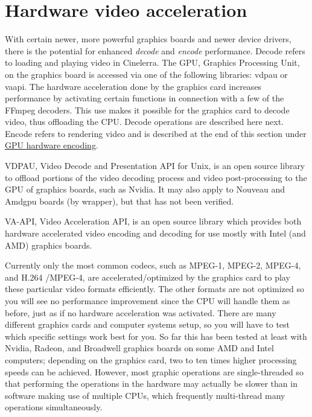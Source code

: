 \section{Hardware video acceleration}%
\label{sec:hardware_video_acceleration}

With certain newer, more powerful graphics boards and newer device drivers, there is the potential for enhanced \textit{decode} and \textit{encode} performance.   Decode refers to loading and playing video in Cinelerra. The GPU, Graphics Processing Unit, on the graphics board is accessed via one of the following libraries: vdpau or vaapi. The hardware acceleration done by the graphics card increases performance by activating certain functions in connection with a few of the FFmpeg decoders. This use makes it possible for the graphics card to decode video, thus offloading the CPU.  Decode operations are described here next.  
Encode refers to rendering video and is described at the end of this section
under \hyperref[sub:gpu_hardware_encoding]{GPU hardware encoding}.

VDPAU, Video Decode and Presentation API for Unix, is an open source library to offload portions of the video decoding process and video post-processing to the GPU of graphics boards, such as Nvidia.  It may also apply to Nouveau and Amdgpu boards (by wrapper), but that has not been verified.

VA-API, Video Acceleration API, is an open source library which provides both hardware accelerated video encoding and decoding for use mostly with Intel (and AMD) graphics boards. 

Currently only the most common codecs, such as MPEG-1, MPEG-2, MPEG-4, and H.264 /MPEG-4, are accelerated/optimized by the graphics card to play these particular video formats efficiently. The other formats are not optimized so you will see no performance improvement since the CPU will handle them as before, just as if no hardware acceleration was activated. There are many different graphics cards and computer systems setup, so you will have to test which specific settings work best for you.  So far this has been tested at least with Nvidia, Radeon, and Broadwell graphics boards on some AMD and Intel computers; depending on the graphics card, two to ten times higher processing speeds can be achieved.  However, most graphic operations are single-threaded so that 
performing the operations in the hardware may actually be slower than in software making use of multiple CPUs, which frequently multi-thread many operations simultaneously.

